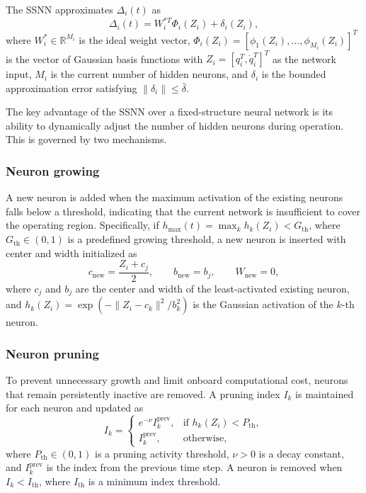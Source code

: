 The SSNN approximates $\Delta_i(t)$ as
\begin{equation}
    \Delta_i(t) = W_i^{*T} \Phi_i(Z_i) + \delta_i(Z_i),
    \label{eq:ssnn_approx}
\end{equation}
where $W_i^* \in \mathbb{R}^{M_i}$ is the ideal weight vector,
$\Phi_i(Z_i) = [\phi_1(Z_i), \ldots, \phi_{M_i}(Z_i)]^T$ is the vector of
Gaussian basis functions with $Z_i = [q_i^T, \dot{q}_i^T]^T$ as the network
input, $M_i$ is the current number of hidden neurons, and $\delta_i$ is the
bounded approximation error satisfying $\|\delta_i\| \leq \bar{\delta}$.

The key advantage of the SSNN over a fixed-structure neural network is its
ability to dynamically adjust the number of hidden neurons during operation.
This is governed by two mechanisms.

\subsubsection*{Neuron growing}
A new neuron is added when the maximum activation of the existing neurons falls
below a threshold, indicating that the current network is insufficient to cover
the operating region. Specifically, if $h_{\max}(t) = \max_k h_k(Z_i) < G_{\text{th}}$,
where $G_{\text{th}} \in (0,1)$ is a predefined growing threshold, a new neuron
is inserted with center and width initialized as
\begin{equation}
    c_{\text{new}} = \frac{Z_i + c_j}{2}, \qquad
    b_{\text{new}} = b_j, \qquad W_{\text{new}} = 0,
    \label{eq:neuron_split}
\end{equation}
where $c_j$ and $b_j$ are the center and width of the least-activated existing
neuron, and $h_k(Z_i) = \exp(-\|Z_i - c_k\|^2 / b_k^2)$ is the Gaussian
activation of the $k$-th neuron.

\subsubsection*{Neuron pruning}
To prevent unnecessary growth and limit onboard computational cost, neurons
that remain persistently inactive are removed. A pruning index $I_k$ is
maintained for each neuron and updated as
\begin{equation}
    I_k = \begin{cases}
        e^{-\nu} I_{k}^{\text{prev}}, & \text{if } h_k(Z_i) < P_{\text{th}}, \\
        I_{k}^{\text{prev}},           & \text{otherwise},
    \end{cases}
    \label{eq:pruning_index}
\end{equation}
where $P_{\text{th}} \in (0,1)$ is a pruning activity threshold, $\nu > 0$ is
a decay constant, and $I_k^{\text{prev}}$ is the index from the previous time
step. A neuron is removed when $I_k < I_{\text{th}}$, where $I_{\text{th}}$ is
a minimum index threshold.

